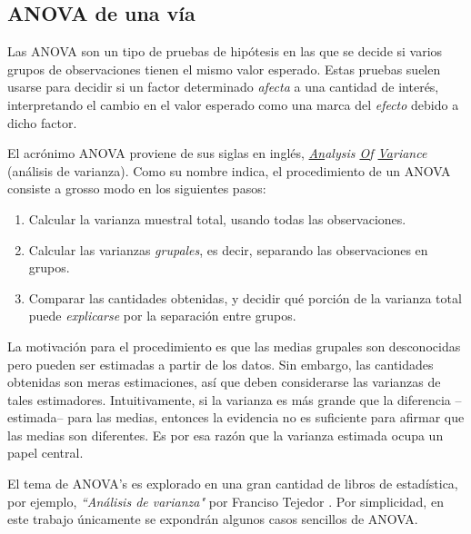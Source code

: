\documentclass[12pt,letterpaper]{book}
\begin{document}

\subsection{ANOVA de una vía}

Las ANOVA son un tipo de pruebas de hipótesis en las que se decide si varios grupos de observaciones tienen el mismo valor esperado.
%
Estas pruebas suelen usarse para decidir si un factor determinado \textit{afecta} a una cantidad de interés, interpretando el cambio en el valor esperado como una marca del \textit{efecto} debido a dicho factor.

El acrónimo ANOVA proviene de sus siglas en inglés, \textit{\underline{An}alysis \underline{O}f \underline{Va}riance} (análisis de varianza). 
%
Como su nombre indica, el procedimiento de un ANOVA consiste a grosso modo en los siguientes pasos:
\begin{enumerate}
\item Calcular la varianza muestral total, usando todas las observaciones.
\item Calcular las varianzas \textit{grupales}, es decir, separando las observaciones en grupos.
\item Comparar las cantidades obtenidas, y decidir qué porción de la varianza total puede \textit{explicarse} por la separación entre grupos.
\end{enumerate} 

La motivación para el procedimiento es que las medias grupales son desconocidas pero pueden ser estimadas a partir de los datos.
%
Sin embargo, las cantidades obtenidas son meras estimaciones, así que deben considerarse las varianzas de tales estimadores.
%
Intuitivamente, si la varianza es más grande que la diferencia --estimada-- para las medias, entonces la evidencia no es suficiente para afirmar que las medias son diferentes.
%
Es por esa razón que la varianza estimada ocupa un papel central.

El tema de ANOVA's es explorado en una gran cantidad de libros de estadística, por ejemplo, \textit{``Análisis de varianza"} por Franciso Tejedor \cite{tejedor99}.
%
Por simplicidad, en este trabajo únicamente se expondrán algunos casos sencillos de ANOVA.
\end{document}
